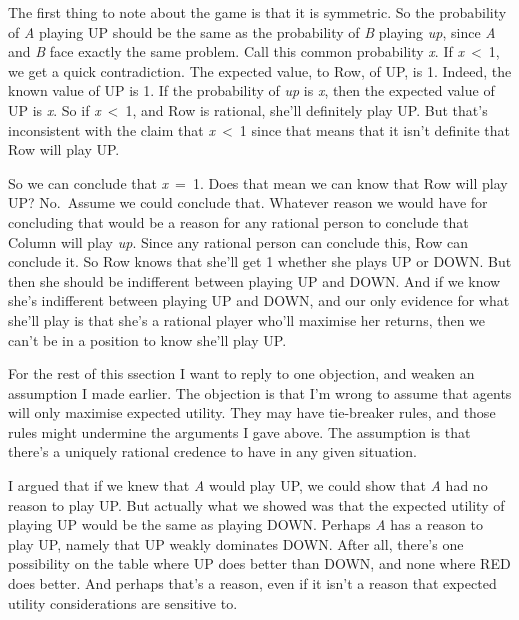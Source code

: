 \documentclass[
  11pt,
]{book}
\begin{document}
The first thing to note about the game is that it is symmetric. So the probability of \emph{A} playing UP should be the same as the probability of \emph{B} playing \emph{up}, since \emph{A} and \emph{B} face exactly the same problem. Call this common probability \emph{x}. If \emph{x}~\textless~1, we get a quick contradiction. The expected value, to Row, of UP, is 1. Indeed, the known value of UP is 1. If the probability of \emph{up} is \emph{x}, then the expected value of UP is \emph{x}. So if \emph{x}~\textless~1, and Row is rational, she'll definitely play UP. But that's inconsistent with the claim that \emph{x}~\textless~1 since that means that it isn't definite that Row will play UP.

So we can conclude that \emph{x}~=~1. Does that mean we can know that Row will play UP? No.~Assume we could conclude that. Whatever reason we would have for concluding that would be a reason for any rational person to conclude that Column will play \emph{up}. Since any rational person can conclude this, Row can conclude it. So Row knows that she'll get 1 whether she plays UP or DOWN. But then she should be indifferent between playing UP and DOWN. And if we know she's indifferent between playing UP and DOWN, and our only evidence for what she'll play is that she's a rational player who'll maximise her returns, then we can't be in a position to know she'll play UP.

For the rest of this ssection I want to reply to one objection, and weaken an assumption I made earlier. The objection is that I'm wrong to assume that agents will only maximise expected utility. They may have tie-breaker rules, and those rules might undermine the arguments I gave above. The assumption is that there's a uniquely rational credence to have in any given situation.

I argued that if we knew that \emph{A} would play UP, we could show that \emph{A} had no reason to play UP. But actually what we showed was that the expected utility of playing UP would be the same as playing DOWN. Perhaps \emph{A} has a reason to play UP, namely that UP weakly dominates DOWN. After all, there's one possibility on the table where UP does better than DOWN, and none where RED does better. And perhaps that's a reason, even if it isn't a reason that expected utility considerations are sensitive to.
\end{document}

